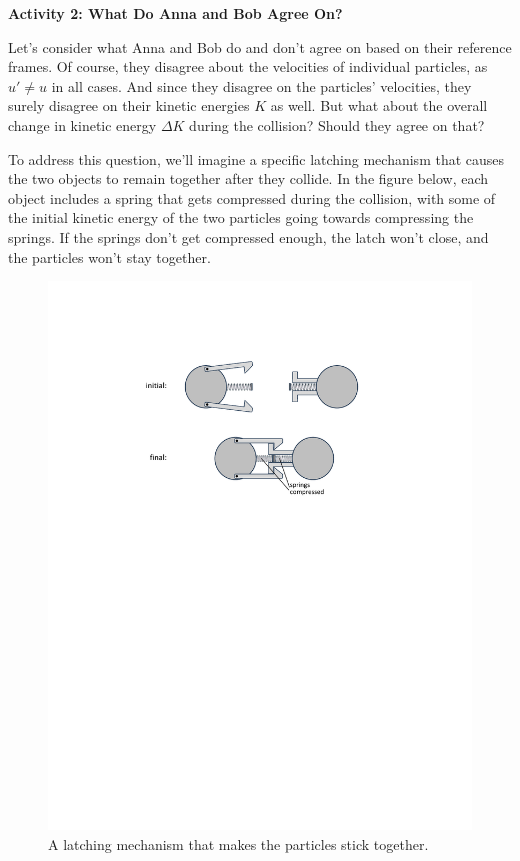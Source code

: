 \textbf{Activity 2: What Do Anna and Bob Agree On?}

Let's consider what Anna and Bob do and don't agree on based on their reference frames.  Of course, they disagree about the velocities of individual particles, as $u' \neq u$ in all cases.  And since they disagree on the particles' velocities, they surely disagree on their kinetic energies $K$ as well.  But what about the overall change in kinetic energy $\Delta K$ during the collision?  Should they agree on that?

To address this question, we'll imagine a specific latching mechanism that causes the two objects to remain together after they collide.  In the figure below, each object includes a spring that gets compressed during the collision, with some of the initial kinetic energy of the two particles going towards compressing the springs.  If the springs don't get compressed enough, the latch won't close, and the particles won't stay together.

\begin{figure}[h!]
\begin{center}
\includegraphics{energy_mass/latching.pdf}
\caption{A latching mechanism that makes the particles stick together.}
\end{center}
\end{figure}


